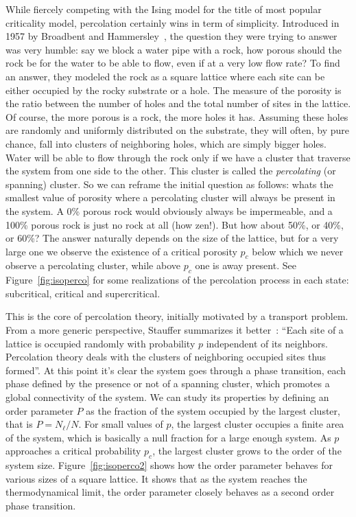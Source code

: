 While fiercely competing with the Ising model for the title of most popular
criticality model, percolation certainly wins in term of simplicity. Introduced
in 1957 by Broadbent and Hammersley~\cite{Broadbent1957}, the question they
were trying to answer was very humble: say we block a water pipe with a rock,
how porous should the rock be for the water to be able to flow, even if at a
very low flow rate? To find an answer, they modeled the rock as a square
lattice where each site can be either occupied by the rocky substrate or a
hole. The measure of the porosity is the ratio between the number of holes and
the total number of sites in the lattice. Of course, the more porous is a rock,
the more holes it has. Assuming these holes are randomly and uniformly
distributed on the substrate, they will often, by pure chance, fall into
clusters of neighboring holes, which are simply bigger holes. Water will be
able to flow through the rock only if we have a cluster that traverse the
system from one side to the other. This cluster is called the
\textit{percolating} (or spanning) cluster. So we can reframe the initial
question as follows: whats the smallest value of porosity where a percolating
cluster will always be present in the system. A 0\% porous rock would obviously
always be impermeable, and a 100\% porous rock is just no rock at all (how
zen!). But how about 50\%, or 40\%, or 60\%? The answer naturally depends on
the size of the lattice, but for a very large one we observe the existence of a
critical porosity $p_c$ below which we never observe a percolating cluster,
while above $p_c$ one is away present. See Figure~\ref{fig:isoperco} for some
realizations of the percolation process in each state: subcritical, critical
and supercritical.

This is the core of percolation theory, initially motivated by a transport
problem. From a more generic perspective, Stauffer summarizes it
better~\cite{Stauffer1994}: ``Each site of a lattice is occupied randomly with
probability $p$ independent of its neighbors. Percolation theory deals with the
clusters of neighboring occupied sites thus formed''. At this point it's clear
the system goes through a phase transition, each phase defined by the presence
or not of a spanning cluster, which promotes a global connectivity of the
system. We can study its properties by defining an order parameter $P$ as the
fraction of the system occupied by the largest cluster, that is $P=N_\ell/N$.
For small values of $p$, the largest cluster occupies a finite area of the
system, which is basically a null fraction for a large enough system. As $p$
approaches a critical probability $p_c$, the largest cluster grows to the order
of the system size. Figure~\ref{fig:isoperco2} shows how the order parameter
behaves for various sizes of a square lattice. It shows that as the system
reaches the thermodynamical limit, the order parameter closely behaves as a
second order phase transition.

